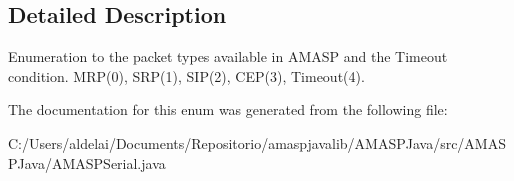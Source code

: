 \subsection{Detailed Description}
Enumeration to the packet types available in A\+M\+A\+SP and the Timeout condition. M\+R\+P(0), S\+R\+P(1), S\+I\+P(2), C\+E\+P(3), Timeout(4). 

The documentation for this enum was generated from the following file\+:\begin{DoxyCompactItemize}
\item 
C\+:/\+Users/aldelai/\+Documents/\+Repositorio/amaspjavalib/\+A\+M\+A\+S\+P\+Java/src/\+A\+M\+A\+S\+P\+Java/A\+M\+A\+S\+P\+Serial.\+java\end{DoxyCompactItemize}
